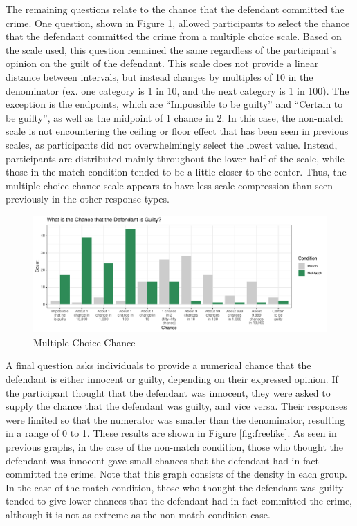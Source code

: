 \documentclass[print]{nuthesis}
\begin{document}
The remaining questions relate to the chance that the defendant committed the crime.
One question, shown in Figure \ref{fig:fixedlike}, allowed participants to select the chance that the defendant committed the crime from a multiple choice scale.
Based on the scale used, this question remained the same regardless of the participant's opinion on the guilt of the defendant.
This scale does not provide a linear distance between intervals, but instead changes by multiples of 10 in the denominator (ex. one category is 1 in 10, and the next category is 1 in 100).
The exception is the endpoints, which are ``Impossible to be guilty'' and ``Certain to be guilty'', as well as the midpoint of 1 chance in 2.
In this case, the non-match scale is not encountering the ceiling or floor effect that has been seen in previous scales, as participants did not overwhelmingly select the lowest value.
Instead, participants are distributed mainly throughout the lower half of the scale, while those in the match condition tended to be a little closer to the center.
Thus, the multiple choice chance scale appears to have less scale compression than seen previously in the other response types.

\begin{figure}

{\centering \includegraphics[width=\linewidth]{thesis_files/figure-latex/fixedlike-1} 

}

\caption{Multiple Choice Chance}\label{fig:fixedlike}
\end{figure}

A final question asks individuals to provide a numerical chance that the defendant is either innocent or guilty, depending on their expressed opinion.
If the participant thought that the defendant was innocent, they were asked to supply the chance that the defendant was guilty, and vice versa.
Their responses were limited so that the numerator was smaller than the denominator, resulting in a range of 0 to 1.
These results are shown in Figure \ref{fig:freelike}.
As seen in previous graphs, in the case of the non-match condition, those who thought the defendant was innocent gave small chances that the defendant had in fact committed the crime.
Note that this graph consists of the density in each group.
In the case of the match condition, those who thought the defendant was guilty tended to give lower chances that the defendant had in fact committed the crime, although it is not as extreme as the non-match condition case.
\end{document}
